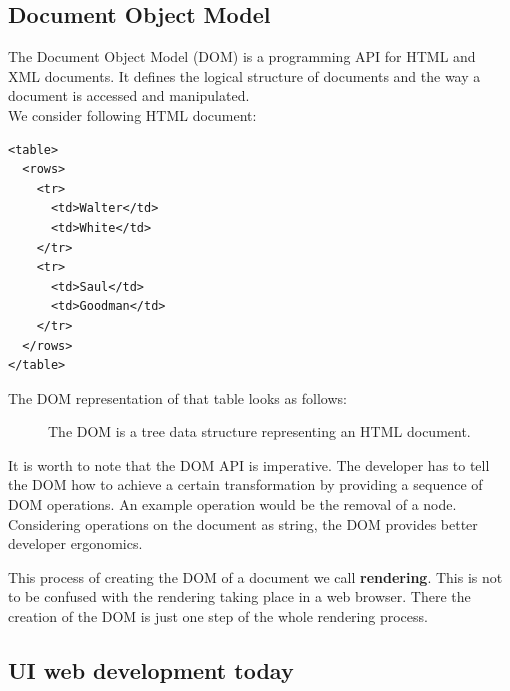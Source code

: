 \subsection{Document Object Model}\label{documentobjectmodel}

The Document Object Model (DOM) is a programming API for HTML and XML documents. It defines the logical structure of documents and the way a document is accessed and manipulated. \citep{domintro} \\ We consider following HTML document:

\lstset{language=XML}
\begin{lstlisting}[caption=HTML document of a table, label=htmloftable]
<table>
  <rows>
    <tr>
      <td>Walter</td>
      <td>White</td>
    </tr>
    <tr>
      <td>Saul</td>
      <td>Goodman</td>
    </tr>
  </rows>
</table>
\end{lstlisting}

The DOM representation of that table looks as follows:

\begin{figure}[!htb]
  \caption{The DOM is a tree data structure representing an HTML document.}
\end{figure}

It is worth to note that the DOM API is imperative. The developer has to tell the DOM how to achieve a certain transformation by providing a sequence of DOM operations. An example operation would be the removal of a node. Considering operations on the document as string, the DOM provides better developer ergonomics.

This process of creating the DOM of a document we call \textbf{rendering}. This is not to be confused with the rendering taking place in a web browser. There the creation of the DOM is just one step of the whole rendering process.

\subsection{UI web development today}\label{uidevelopmenttoday}

